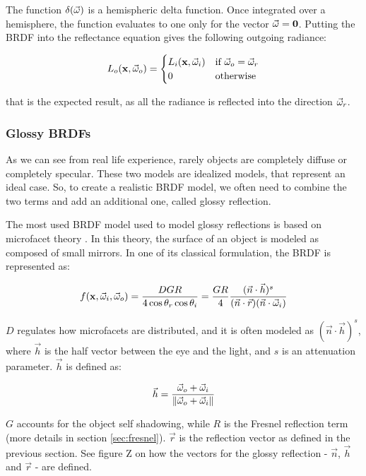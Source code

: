 The function $\delta(\vec{\omega})$ is a hemispheric delta function. Once integrated over a hemisphere, the function evaluates to one only for the vector $\vec{\omega} = \mathbf{0}$. Putting the BRDF into the reflectance equation gives the following outgoing radiance:

\begin{equation*}
L_o(\mathbf{x}, \vec{\omega}_o) = \begin{cases}
L_i(\mathbf{x}, \vec{\omega}_i)  &\text{if $\vec{\omega}_o = \vec{\omega}_r$}\\
0 &\text{otherwise}
\end{cases}
\end{equation*}

that is the expected result, as all the radiance is reflected into the direction $\vec{\omega}_r$.

\subsubsection{Glossy BRDFs}

As we can see from real life experience, rarely objects are completely diffuse or completely specular. These two models are idealized models, that represent an ideal case. So, to create a realistic BRDF model, we often need to combine the two terms and add an additional one, called glossy reflection.

The most used BRDF model used to model glossy reflections is based on microfacet theory \citep{Ashikmin:2000:MBG:344779.344814}. In this theory, the surface of an object is modeled as composed of small mirrors. In one of its classical formulation, the BRDF is represented as:

$$
f(\mathbf{x}, \vec{\omega}_i, \vec{\omega}_o) = \frac{D G R}{4 \cos\theta_r \cos\theta_i} = \frac{G R}{4} \frac{(\vec{n}\cdot\vec{h})^s}{(\vec{n}\cdot\vec{r})(\vec{n}\cdot\vec{\omega}_i)}
$$

$D$ regulates how microfacets are distributed, and it is often modeled as $(\vec{n}\cdot\vec{h})^s$, where $\vec{h}$ is the half vector between the eye and the light, and $s$ is an attenuation parameter. $\vec{h}$ is defined as:

$$
\vec{h} = \frac{\vec{\omega}_o + \vec{\omega}_i}{\left\| \vec{\omega}_o + \vec{\omega}_i \right\|}
$$

$G$ accounts for the object self shadowing, while $R$ is the Fresnel reflection term (more details in section \ref{sec:fresnel}).	$\vec{r}$ is the reflection vector as defined in the previous section. See figure Z on how the vectors for the glossy reflection - $\vec{n}$, $\vec{h}$ and $\vec{r}$ - are defined.

